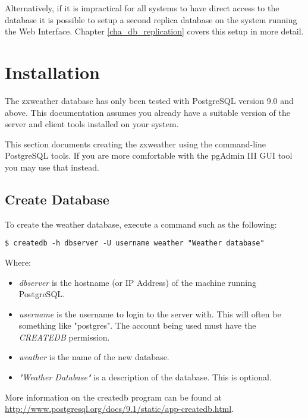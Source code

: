 \documentclass[a4paper,10pt,draft]{book}
\begin{document}
Alternatively, if it is impractical for all systems to have direct access to the database it is possible to setup a second replica database on the system running the Web Interface. Chapter \ref{cha_db_replication} covers this setup in more detail.

\section{Installation}


The zxweather database has only been tested with PostgreSQL version 9.0 and above. This documentation assumes you already have a suitable version of the server and client tools installed on your system.

This section documents creating the zxweather using the command-line PostgreSQL tools. If you are more comfortable with the pgAdmin III GUI tool you may use that instead.

\subsection{Create Database}
To create the weather database, execute a command such as the following:

\begin{verbatim}
$ createdb -h dbserver -U username weather "Weather database"
\end{verbatim}

Where:
\begin{itemize}
\item \emph{dbserver} is the hostname (or IP Address) of the machine running PostgreSQL.
\item \emph{username} is the username to login to the server with. This will often be something like "postgres". The account being used must have the \emph{CREATEDB} permission.
\item \emph{weather} is the name of the new database.
\item \emph{"Weather Database"} is a description of the database. This is optional.
\end{itemize}

More information on the createdb program can be found at \url{http://www.postgresql.org/docs/9.1/static/app-createdb.html}.
\end{document}
